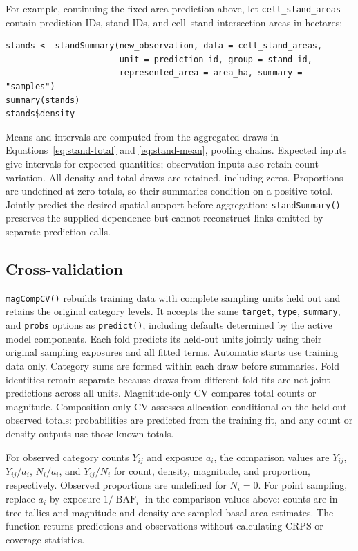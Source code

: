 \documentclass[11pt]{article}
\begin{document}
For example, continuing the fixed-area prediction above, let
\texttt{cell\_stand\_areas} contain prediction IDs, stand IDs, and cell--stand
intersection areas in hectares:
\begin{verbatim}
stands <- standSummary(new_observation, data = cell_stand_areas,
                       unit = prediction_id, group = stand_id,
                       represented_area = area_ha, summary = "samples")
summary(stands)
stands$density
\end{verbatim}
Means and intervals are computed from the aggregated draws in
Equations~\ref{eq:stand-total} and \ref{eq:stand-mean}, pooling chains.
Expected inputs give intervals for expected quantities; observation inputs
also retain count variation. All density and total draws are retained,
including zeros. Proportions are undefined at zero totals, so their summaries
condition on a positive total. Jointly predict the desired spatial support before aggregation:
\texttt{standSummary()} preserves the supplied dependence but cannot reconstruct
links omitted by separate prediction calls.

\subsection{Cross-validation}

\texttt{magCompCV()} rebuilds training data with complete sampling units held
out and retains the original category levels. It accepts the same
\texttt{target}, \texttt{type}, \texttt{summary}, and \texttt{probs} options
as \texttt{predict()}, including defaults determined by the active model
components. Each fold predicts its held-out units jointly using their original
sampling exposures and all fitted terms. Automatic starts use training data
only. Category sums are formed within each draw before summaries. Fold identities
remain separate because draws from different fold fits are not joint
predictions across all units. Magnitude-only CV compares total counts or
magnitude. Composition-only CV assesses allocation conditional on the held-out
observed totals: probabilities are predicted from the training fit, and any
count or density outputs use those known totals.

For observed category counts \(Y_{ij}\) and exposure \(a_i\), the comparison
values are \(Y_{ij}\), \(Y_{ij}/a_i\), \(N_i/a_i\), and \(Y_{ij}/N_i\)
for count, density, magnitude, and proportion, respectively. Observed
proportions are undefined for \(N_i=0\). For point sampling,
replace \(a_i\) by exposure \(1/\operatorname{BAF}_i\)
in the comparison values above: counts are in-tree tallies and magnitude and
density are sampled basal-area estimates. The function returns predictions
and observations without calculating CRPS or coverage statistics.
\end{document}
